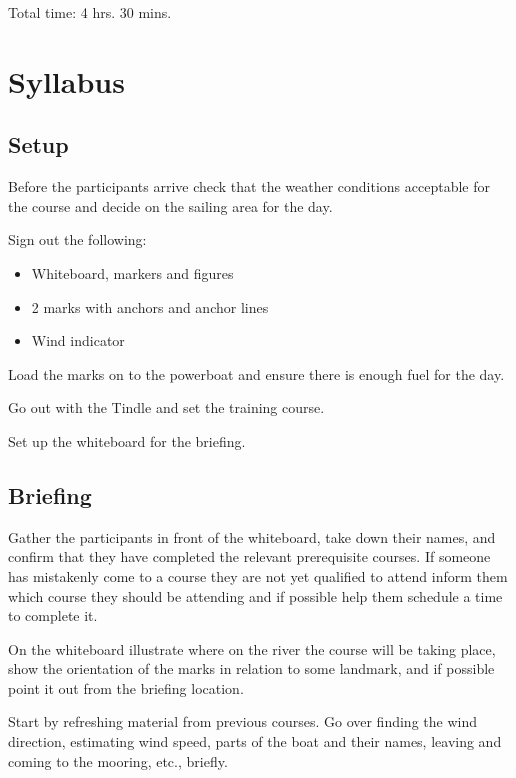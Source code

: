\documentclass[12pt]{scrartcl}
\begin{document}
Total time: 4 hrs. 30 mins.

\newpage

\section{Syllabus} \label{sec:syllabus}

\subsection{Setup} \label{subsec:setup}

Before the participants arrive check that the weather conditions acceptable for the course and decide on the sailing area for the day.

Sign out the following:

\label{list:materials}
\begin{itemize}
	\item Whiteboard, markers and figures
	\item 2 marks with anchors and anchor lines
	\item Wind indicator
\end{itemize}

Load the marks on to the powerboat and ensure there is enough fuel for the day.

Go out with the Tindle and set the training course.

Set up the whiteboard for the briefing.

\subsection{Briefing} \label{subsec:briefing}

Gather the participants in front of the whiteboard, take down their names, and confirm that they have completed the relevant prerequisite courses. If someone has mistakenly come to a course they are not yet qualified to attend inform them which course they should be attending and if possible help them schedule a time to complete it.

On the whiteboard illustrate where on the river the course will be taking place, show the orientation of the marks in relation to some landmark, and if possible point it out from the briefing location.

Start by refreshing material from previous courses. Go over finding the wind direction, estimating wind speed, parts of the boat and their names, leaving and coming to the mooring, etc., briefly.
\end{document}
